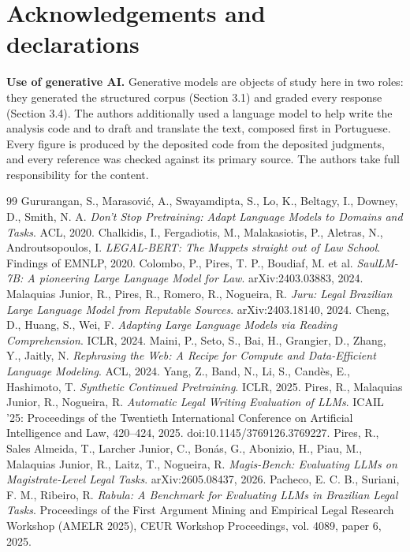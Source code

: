\documentclass{IOS-Book-Article}
\begin{document}
\section*{Acknowledgements and declarations}
\textbf{Use of generative AI.} Generative models are objects of study here in two roles: they generated the structured corpus (Section 3.1) and graded every response (Section 3.4). The authors additionally used a language model to help write the analysis code and to draft and translate the text, composed first in Portuguese. Every figure is produced by the deposited code from the deposited judgments, and every reference was checked against its primary source. The authors take full responsibility for the content.

\begin{thebibliography}{99}
 Gururangan, S., Marasović, A., Swayamdipta, S., Lo, K., Beltagy, I., Downey, D., Smith, N. A. \emph{Don't Stop Pretraining: Adapt Language Models to Domains and Tasks}. ACL, 2020.
 Chalkidis, I., Fergadiotis, M., Malakasiotis, P., Aletras, N., Androutsopoulos, I. \emph{LEGAL-BERT: The Muppets straight out of Law School}. Findings of EMNLP, 2020.
 Colombo, P., Pires, T. P., Boudiaf, M. et al. \emph{SaulLM-7B: A pioneering Large Language Model for Law}. arXiv:2403.03883, 2024.
 Malaquias Junior, R., Pires, R., Romero, R., Nogueira, R. \emph{Juru: Legal Brazilian Large Language Model from Reputable Sources}. arXiv:2403.18140, 2024.
 Cheng, D., Huang, S., Wei, F. \emph{Adapting Large Language Models via Reading Comprehension}. ICLR, 2024.
 Maini, P., Seto, S., Bai, H., Grangier, D., Zhang, Y., Jaitly, N. \emph{Rephrasing the Web: A Recipe for Compute and Data-Efficient Language Modeling}. ACL, 2024.
 Yang, Z., Band, N., Li, S., Candès, E., Hashimoto, T. \emph{Synthetic Continued Pretraining}. ICLR, 2025.
 Pires, R., Malaquias Junior, R., Nogueira, R. \emph{Automatic Legal Writing Evaluation of LLMs}. ICAIL '25: Proceedings of the Twentieth International Conference on Artificial Intelligence and Law, 420--424, 2025. doi:10.1145/3769126.3769227.
 Pires, R., Sales Almeida, T., Larcher Junior, C., Bonás, G., Abonizio, H., Piau, M., Malaquias Junior, R., Laitz, T., Nogueira, R. \emph{Magis-Bench: Evaluating LLMs on Magistrate-Level Legal Tasks}. arXiv:2605.08437, 2026.
 Pacheco, E. C. B., Suriani, F. M., Ribeiro, R. \emph{Rabula: A Benchmark for Evaluating LLMs in Brazilian Legal Tasks}. Proceedings of the First Argument Mining and Empirical Legal Research Workshop (AMELR 2025), CEUR Workshop Proceedings, vol. 4089, paper 6, 2025.

\end{thebibliography}
\end{document}
